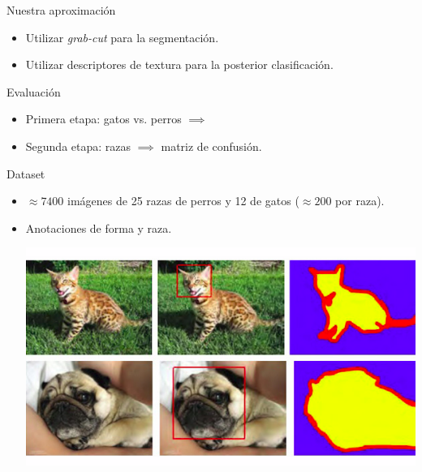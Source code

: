\documentclass{beamer}
\begin{document}
\begin{frame}{Nuestra aproximación}
    \begin{itemize}
        \item Utilizar \emph{grab-cut} para la segmentación.
            \pause
        \item Utilizar descriptores de textura para la posterior
            clasificación.
    \end{itemize}
\end{frame}
\begin{frame}{Evaluación}
    \begin{itemize}
        \item Primera etapa: gatos vs. perros $\implies$
            \pause
        \item Segunda etapa: razas $\implies$ matriz de confusión.
    \end{itemize}
\end{frame}
\begin{frame}{Dataset}
    \begin{itemize}
        \item $\approx 7400$ imágenes de 25 razas de perros y 12 de gatos
            ($\approx 200$ por raza).
        \item Anotaciones de forma y raza.
            \pause
            \begin{center}
                \includegraphics[scale=0.3]{imagen/catsanddogs_annotation}
            \end{center}
    \end{itemize}
\end{frame}
\end{document}
